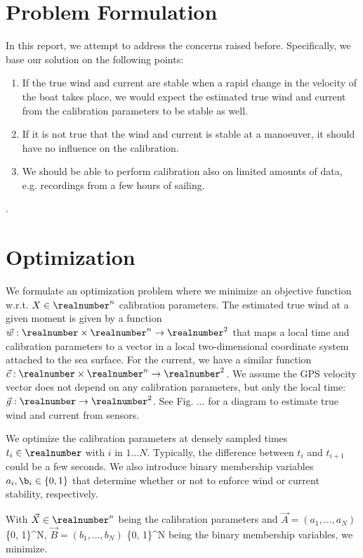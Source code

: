 \section{Problem Formulation}
In this report, we attempt to address the concerns raised before. Specifically, we base our solution on the following points:
\begin{enumerate}
 \item If the true wind and current are stable when a rapid change in the velocity of the boat takes place, we would expect the estimated true wind and current from the calibration parameters to be stable as well.
 \item If it is not true that the wind and current is stable at a manoeuver, it should have no influence on the calibration.
 \item We should be able to perform calibration also on limited amounts of data, e.g. recordings from a few hours of sailing.
\end{enumerate}.

\section{Optimization}
We formulate an optimization problem where we minimize an objective function w.r.t. $X \in \realnumber^n$ calibration parameters. The estimated true wind at a given moment is given by a function $\vec{w}: \realnumber \times \realnumber^n \rightarrow \realnumber^2$ that maps a local time and calibration parameters to a vector in a local two-dimensional coordinate system attached to the sea surface. For the current, we have a similar function $\vec{c}: \realnumber \times \realnumber^n \rightarrow \realnumber^2$. We assume the GPS velocity vector does not depend on any calibration parameters, but only the local time: $\vec{g}: \realnumber \rightarrow \realnumber^2$. See Fig. ... for a diagram to estimate true wind and current from sensors.

We optimize the calibration parameters at densely sampled times $t_i \in \realnumber$ with $i$ in $1 \ldots N$. Typically, the difference between $t_i$ and $t_{i+1}$ could be a few seconds. We also introduce binary membership variables $a_i, \b_i \in \{0, 1\}$ that determine whether or not to enforce wind or current stability, respectively.

With $\vec{X} \in \realnumber^n$ being the calibration parameters and $\vec{A} = (a_1, ..., a_N)$ \in \{0, 1\}^N, $\vec{B} = (b_1, ..., b_N)$ \in \{0, 1\}^N being the binary membership variables, we minimize.

